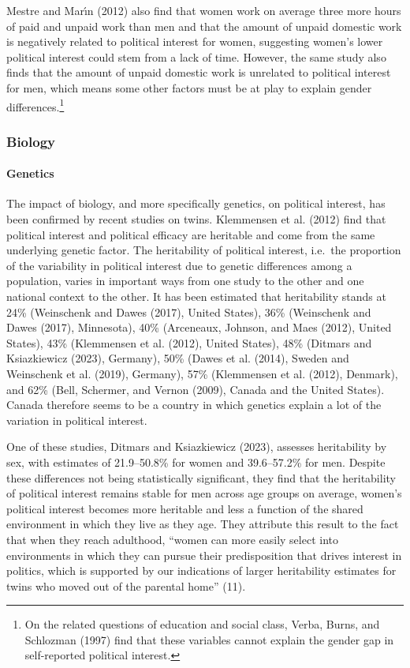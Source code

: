 \documentclass[
  letterpaper,
  DIV=11,
  numbers=noendperiod]{scrreprt}
\let\oldparagraph\paragraph
\renewcommand{\paragraph}[1]{\oldparagraph{#1}\mbox{}}
\begin{document}
Mestre and Marı́n (2012) also find that women work on average three more
hours of paid and unpaid work than men and that the amount of unpaid
domestic work is negatively related to political interest for women,
suggesting women's lower political interest could stem from a lack of
time. However, the same study also finds that the amount of unpaid
domestic work is unrelated to political interest for men, which means
some other factors must be at play to explain gender
differences.\footnote{On the related questions of education and social
  class, Verba, Burns, and Schlozman (1997) find that these variables
  cannot explain the gender gap in self-reported political interest.}

\subsubsection{Biology}\label{biology}

\paragraph{Genetics}\label{genetics}

The impact of biology, and more specifically genetics, on political
interest, has been confirmed by recent studies on twins. Klemmensen et
al. (2012) find that political interest and political efficacy are
heritable and come from the same underlying genetic factor. The
heritability of political interest, i.e.~the proportion of the
variability in political interest due to genetic differences among a
population, varies in important ways from one study to the other and one
national context to the other. It has been estimated that heritability
stands at 24\% (Weinschenk and Dawes (2017), United States), 36\%
(Weinschenk and Dawes (2017), Minnesota), 40\% (Arceneaux, Johnson, and
Maes (2012), United States), 43\% (Klemmensen et al. (2012), United
States), 48\% (Ditmars and Ksiazkiewicz (2023), Germany), 50\% (Dawes et
al. (2014), Sweden and Weinschenk et al. (2019), Germany), 57\%
(Klemmensen et al. (2012), Denmark), and 62\% (Bell, Schermer, and
Vernon (2009), Canada and the United States). Canada therefore seems to
be a country in which genetics explain a lot of the variation in
political interest.

One of these studies, Ditmars and Ksiazkiewicz (2023), assesses
heritability by sex, with estimates of 21.9--50.8\% for women and
39.6--57.2\% for men. Despite these differences not being statistically
significant, they find that the heritability of political interest
remains stable for men across age groups on average, women's political
interest becomes more heritable and less a function of the shared
environment in which they live as they age. They attribute this result
to the fact that when they reach adulthood, ``women can more easily
select into environments in which they can pursue their predisposition
that drives interest in politics, which is supported by our indications
of larger heritability estimates for twins who moved out of the parental
home'' (11).
\end{document}
